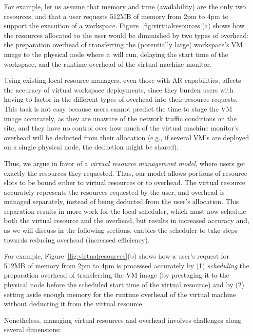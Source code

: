 For example, let us assume that memory and time (availability) are the only two resources, and that a user requests 512MB of memory from 2pm to 4pm to support the execution of a workspace. Figure~\ref{fig:virtualresources}(a) shows how the resources allocated to the user would be diminished by two types of overhead: the preparation overhead of transferring the (potentially large) workspace's VM image to the physical node where it will run, delaying the start time of the workspace, and the runtime overhead of the virtual machine monitor. 

Using existing local resource managers, even those with AR capabilities, affects the accuracy of virtual workspace deployments, since they burden users with having to factor in the different types of overhead into their resource requests. This task is not easy because users cannot  predict the time to stage the VM image accurately, as they are unaware of the network traffic conditions on the site, and they have no control over how much of the virtual machine monitor's overhead will be deducted from their allocation (e.g., if several VM's are deployed on a single physical node, the deduction might be shared).

Thus, we argue in favor of a \emph{virtual resource management model}, where users get exactly the resources they requested. Thus, our model allows portions of resource slots to be bound either to virtual resources or
to overhead. The virtual resource accurately represents the resources requested by the user, and overhead is managed separately, instead of being deducted from the user's allocation. This separation results in more work for the local scheduler, which must now schedule both the virtual resource and the overhead, but results in increased accuracy and, as we will discuss in the following sections, enables the scheduler to take steps towards reducing overhead (increased efficiency).

For example, Figure~\ref{fig:virtualresources}(b) shows how a user's request for 512MB of memory from 2pm to 4pm is processed accurately by (1) \emph{scheduling} the preparation overhead of transferring the VM image (by prestaging it to the physical node before the scheduled start time of the virtual resource) and by (2) setting aside enough memory for the runtime overhead of the virtual machine without deducting it from the virtual resource.

Nonetheless, managing virtual resources and overhead involves challenges along several dimensions:

